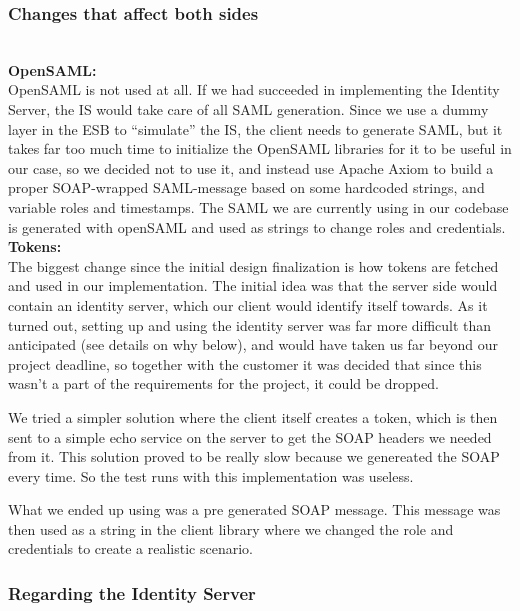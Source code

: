     \subsubsection{Changes that affect both sides}\label{Changes:both}\\
    
\indent \indent \textbf{OpenSAML:}\\
OpenSAML is not used at all. If we had succeeded in implementing the Identity Server, the IS would take care of all SAML generation. Since we use a dummy layer in the ESB to “simulate” the IS, the client needs to generate SAML, but it takes far too much time to initialize the OpenSAML libraries for it to be useful in our case, so we decided not to use it, and instead use Apache Axiom to build a proper SOAP-wrapped SAML-message based on some hardcoded strings, and variable roles and timestamps. The SAML we are currently using in our codebase is generated with openSAML and used as strings to change roles and credentials.\\

\textbf{Tokens:}\\
The biggest change since the initial design finalization is how tokens are fetched and used in our implementation. The initial idea was that the server side would contain an identity server, which our client would identify itself towards. As it turned out, setting up and using the identity server was far more difficult than anticipated (see details on why below), and would have taken us far beyond our project deadline, so together with the customer it was decided that since this wasn't a part of the requirements for the project, it could be dropped. 
    
We tried a simpler solution where the client itself creates a token, which is then sent to a simple echo service on the server to get the SOAP headers we needed from it. This solution proved to be really slow because we genereated the SOAP every time. So the test runs with this implementation was useless. 

What we ended up using was a pre generated SOAP message. This message was then used as a string in the client library where we changed the role and credentials to create a realistic scenario. 

    \subsubsection{Regarding the Identity Server}\label{Changes:IS}
    
